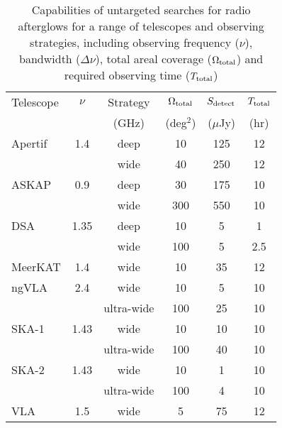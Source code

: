 \begin{table}
    \caption[Untargeted searches for radio afterglows]{Capabilities of untargeted searches for radio afterglows for a range of telescopes and observing strategies, including observing frequency ($\nu$), bandwidth ($\Delta\nu$), total areal coverage ($\Omega_{\rm total}$) and required observing time ($T_{\rm total}$)}
    \label{tab:untargeted_searches}
    \centering
    \begin{threeparttable}
    \begin{tabular}{lccccc}
    \hline\hline
    Telescope & $\nu$ & Strategy & $\Omega_{\rm total}$ & $S_{\rm detect}$ & $T_{\rm total}$\\
     & & {(GHz)} & {(deg$^2$)} & {($\mu$Jy)} & {(hr)}\\
    \hline
    Apertif & 1.4 & deep & 10 & 125 & 12\\
     & & wide & 40 & 250 & 12\\
    \rule{0pt}{3ex}ASKAP & 0.9 & deep & 30 & 175 & 10\\
     & & wide & 300 & 550 & 10\\
    \rule{0pt}{3ex}DSA & 1.35 & deep & 10 & 5 & 1\\
     & & wide & 100 & 5 & 2.5\\
    \rule{0pt}{3ex}MeerKAT & 1.4 & wide & 10 & 35 & 12\\
    \rule{0pt}{3ex}ngVLA & 2.4 & wide & 10 & 5 & 10\\
     & & ultra-wide & 100 & 25 & 10\\
    \rule{0pt}{3ex}SKA-1 & 1.43 & wide & 10 & 10 & 10\\
     & & ultra-wide & 100 & 40 & 10\\
    \rule{0pt}{3ex}SKA-2 & 1.43 & wide & 10 & 1 & 10\\
     & & ultra-wide & 100 & 4 & 10\\
    \rule{0pt}{3ex}VLA & 1.5 & wide & 5 & 75 & 12\\
    \hline\hline
    \end{tabular}
    \end{threeparttable}
\end{table}
